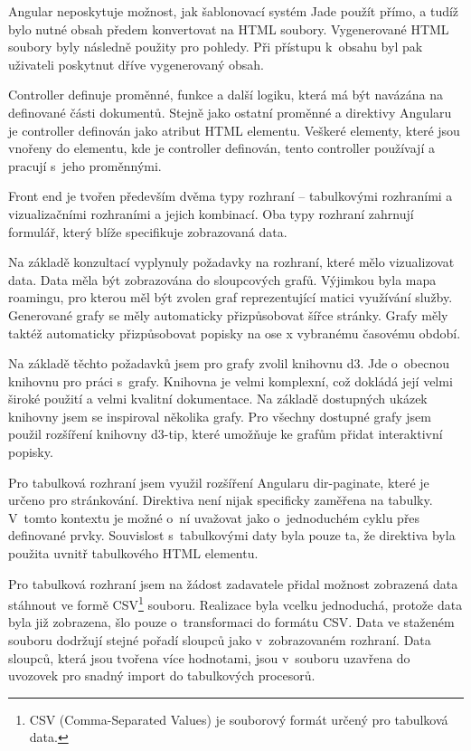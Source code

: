 \documentclass[thesis=M,czech]{FITthesis}[2012/06/26]
\begin{document}
      Angular neposkytuje možnost, jak šablonovací systém Jade použít přímo,
      a tudíž bylo nutné obsah předem konvertovat na HTML soubory.
      Vygenerované HTML soubory byly následně použity pro pohledy.
      Při přístupu k~obsahu byl pak uživateli poskytnut dříve vygenerovaný obsah.

      Controller definuje proměnné, funkce a další logiku, která má být navázána na definované části dokumentů.
      Stejně jako ostatní proměnné a direktivy Angularu je controller definován jako atribut HTML elementu.
      Veškeré elementy, které jsou vnořeny do elementu,
      kde je controller definován, tento controller používají a pracují s~jeho proměnnými.

      Front end je tvořen především dvěma typy rozhraní -- tabulkovými rozhraními a 
      vizualizačními rozhraními a jejich kombinací.
      Oba typy rozhraní zahrnují formulář,
      který blíže specifikuje zobrazovaná data.

      Na základě konzultací vyplynuly požadavky na rozhraní, které mělo vizualizovat data.
      Data měla být zobrazována do sloupcových grafů.
      Výjimkou byla mapa roamingu, pro kterou měl být zvolen graf reprezentující
      matici využívání služby.
      Generované grafy se měly automaticky přizpůsobovat šířce stránky.
      Grafy měly taktéž automaticky přizpůsobovat popisky na ose x vybranému časovému období.

      Na základě těchto požadavků jsem pro grafy zvolil knihovnu d3.
      Jde o~obecnou knihovnu pro práci s~grafy.
      Knihovna je velmi komplexní, což dokládá její velmi široké použití a velmi kvalitní dokumentace.
      Na základě dostupných ukázek knihovny jsem se inspiroval
      několika grafy.
      Pro všechny dostupné grafy jsem použil rozšíření knihovny d3-tip,
      které umožňuje ke grafům přidat interaktivní popisky.

      Pro tabulková rozhraní jsem využil rozšíření Angularu dir-paginate,
      které je určeno pro stránkování.
      Direktiva není nijak specificky zaměřena na tabulky.
      V~tomto kontextu je možné o~ní uvažovat jako
      o~jednoduchém cyklu přes definované prvky.
      Souvislost s~tabulkovými daty byla pouze ta, 
      že direktiva byla použita uvnitř tabulkového HTML elementu.
      
      Pro tabulková rozhraní jsem na žádost zadavatele přidal
      možnost zobrazená data stáhnout ve formě CSV\footnote{
        CSV (Comma-Separated Values) je souborový formát určený pro tabulková data.
      }
      souboru.
      Realizace byla vcelku jednoduchá, protože data byla již zobrazena,
      šlo pouze o~transformaci do formátu CSV.
      Data ve staženém souboru dodržují stejné pořadí sloupců jako v~zobrazovaném rozhraní.
      Data sloupců, která jsou tvořena více hodnotami, jsou v~souboru uzavřena do uvozovek
      pro snadný import do tabulkových procesorů.
\end{document}
